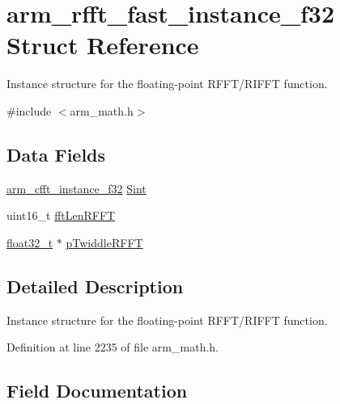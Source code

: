 \hypertarget{structarm__rfft__fast__instance__f32}{}\section{arm\+\_\+rfft\+\_\+fast\+\_\+instance\+\_\+f32 Struct Reference}
\label{structarm__rfft__fast__instance__f32}


Instance structure for the floating-\/point R\+F\+F\+T/\+R\+I\+F\+FT function.  




{\ttfamily \#include $<$arm\+\_\+math.\+h$>$}

\subsection*{Data Fields}
\begin{DoxyCompactItemize}
\item 
\hyperlink{structarm__cfft__instance__f32}{arm\+\_\+cfft\+\_\+instance\+\_\+f32} \hyperlink{structarm__rfft__fast__instance__f32_aa8a05a9fabc3852e5d476152a5067e53}{Sint}
\item 
uint16\+\_\+t \hyperlink{structarm__rfft__fast__instance__f32_a174f8c72d545034e19ba4ced52b31353}{fft\+Len\+R\+F\+FT}
\item 
\hyperlink{arm__math_8h_a4611b605e45ab401f02cab15c5e38715}{float32\+\_\+t} $\ast$ \hyperlink{structarm__rfft__fast__instance__f32_a43370fe848d06993faf834da07ca91ce}{p\+Twiddle\+R\+F\+FT}
\end{DoxyCompactItemize}


\subsection{Detailed Description}
Instance structure for the floating-\/point R\+F\+F\+T/\+R\+I\+F\+FT function. 

Definition at line 2235 of file arm\+\_\+math.\+h.



\subsection{Field Documentation}
